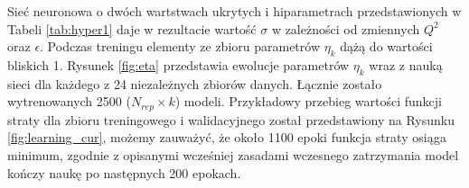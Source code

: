 \documentclass[11pt]{book}
\theoremstyle{definition}
\begin{document}
Sieć neuronowa o dwóch wartstwach ukrytych i hiparametrach przedstawionych w Tabeli \ref{tab:hyper1} daje w rezultacie wartość $\sigma$ w zależności od zmiennych $Q^2$ oraz $\epsilon$. Podczas treningu elementy ze zbioru parametrów $\eta_k$ dążą do wartości bliskich 1. %
Rysunek \ref{fig:eta} przedstawia ewolucje parametrów $\eta_k$ wraz z nauką sieci dla każdego z 24 niezależnych zbiorów danych. Łącznie zostało wytrenowanych 2500 ($N_{rep} \times k$) modeli. Przykładowy przebieg wartości funkcji straty dla zbioru treningowego i walidacyjnego został przedstawiony na Rysunku \ref{fig:learning_cur}, możemy zauważyć, że około 1100 epoki funkcja straty osiąga minimum, zgodnie z opisanymi wcześniej zasadami wczesnego zatrzymania model kończy naukę po następnych 200 epokach. 
\end{document}
